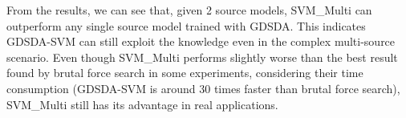 From the results, we can see that, given 2 source models, SVM\_Multi can outperform any single source model trained with GDSDA. This indicates GDSDA-SVM can still exploit the knowledge even in the complex multi-source scenario. Even though SVM\_Multi performs slightly worse than the best result found by brutal force search in some experiments, considering their time consumption (GDSDA-SVM is around 30 times faster than brutal force search), SVM\_Multi still has its advantage in real applications.




